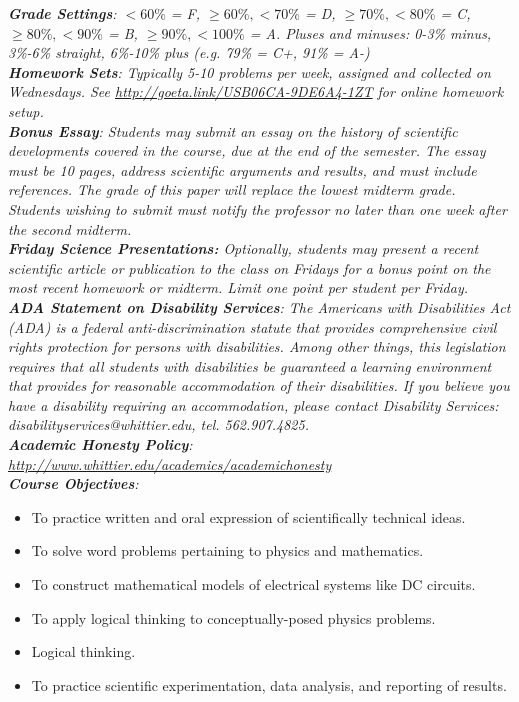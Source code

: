 \documentclass[10pt]{article}
\begin{document}
\textit{\textbf{Grade Settings}: $<60\%$ = F, $\geq 60\%, <70\%$ = D, $\geq 70\%, <80\%$ = C, $\geq 80\%, <90\%$ = B, $\geq 90\%, <100\%$ = A.  Pluses and minuses: 0-3\% minus, 3\%-6\% straight, 6\%-10\% plus (e.g. 79\% = C+, 91\% = A-)} \\
\textit{\textbf{Homework Sets}: Typically 5-10 problems per week, assigned and collected on Wednesdays.  See \url{http://goeta.link/USB06CA-9DE6A4-1ZT} for online homework setup.} \\
\textit{\textbf{Bonus Essay}: Students may submit an essay on the history of scientific developments covered in the course, due at
the end of the semester. The essay must be 10 pages, address scientific arguments and results, and must include
references. The grade of this paper will replace the lowest midterm grade.  Students wishing to submit must notify the professor no later than one week after the second midterm.} \\
\textit{\textbf{Friday Science Presentations:} Optionally, students may present a recent scientific article or publication to the class on Fridays for a bonus point on the most recent homework or midterm.  Limit one point per student per Friday.} \\
\textit{\textbf{ADA Statement on Disability Services}: The Americans with Disabilities Act (ADA) is a federal anti-discrimination statute that provides comprehensive civil rights protection for persons with disabilities. Among other things, this legislation requires that all students with disabilities be guaranteed a learning environment that provides for reasonable accommodation of their disabilities. If you believe you have a disability requiring an accommodation, please contact Disability Services: disabilityservices@whittier.edu, tel. 562.907.4825.} \\
\textit{\textbf{Academic Honesty Policy}: \url{http://www.whittier.edu/academics/academichonesty}} \\
\textit{\textbf{Course Objectives}:}
\begin{itemize}
\item To practice written and oral expression of scientifically technical ideas.
\item To solve word problems pertaining to physics and mathematics.
\item To construct mathematical models of electrical systems like DC circuits.
\item To apply logical thinking to conceptually-posed physics problems.
\item Logical thinking.
\item To practice scientific experimentation, data analysis, and reporting of results.
\end{itemize}
\end{document}
